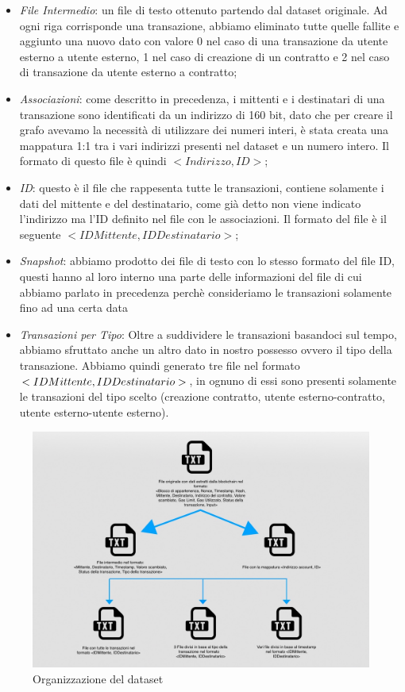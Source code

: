 \documentclass[12pt]{report}
\begin{document}
\begin{itemize}
    \item \textit{File Intermedio}: un file di testo ottenuto partendo dal dataset originale. Ad ogni riga corrisponde una transazione, abbiamo eliminato tutte quelle fallite e aggiunto una nuovo dato con valore 0 nel caso di una transazione da utente esterno a utente esterno, 1 nel caso di creazione di un contratto e 2 nel caso di transazione da utente esterno a contratto;
    \item \textit{Associazioni}: come descritto in precedenza, i mittenti e i destinatari di una transazione sono identificati da un indirizzo di 160 bit, dato che per creare il grafo avevamo la necessità di utilizzare dei numeri interi, è stata creata una mappatura 1:1 tra i vari indirizzi presenti nel dataset e un numero intero.
    Il formato di questo file è quindi $<Indirizzo, ID>$;
    \item \textit{ID}: questo è il file che rappesenta tutte le transazioni, contiene solamente i dati del mittente e del destinatario, come già detto non viene indicato l'indirizzo ma l'ID definito nel file con le associazioni. Il formato del file è il seguente $<IDMittente,  IDDestinatario>$;
    \item \textit{Snapshot}: abbiamo prodotto dei file di testo con lo stesso formato del file ID, questi hanno al loro interno una parte delle informazioni del file di cui abbiamo parlato in precedenza perchè consideriamo le transazioni solamente fino ad una certa data
    \item \textit{Transazioni per Tipo}: Oltre a suddividere le transazioni basandoci sul tempo, abbiamo sfruttato anche un altro dato in nostro possesso ovvero il tipo della transazione. Abbiamo quindi generato tre file nel formato $<IDMittente,\newline
    IDDestinatario>$, in ognuno di essi sono presenti solamente le transazioni del tipo scelto (creazione contratto, utente esterno-contratto, utente esterno-utente esterno).
\end{itemize}

\begin{figure}[H]
    \includegraphics[width=\textwidth]{MappaFile}
    \caption{Organizzazione del dataset}
\end{figure}
\end{document}
